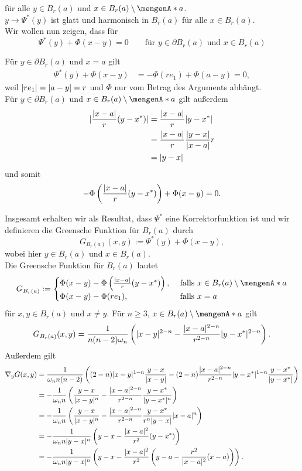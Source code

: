 für alle $y \in B_r(a)$ und $x \in B_r(a) \setminus \set{a}$. \\
$y \to \Psi^*(y)$ ist glatt und harmonisch in $B_r(a)$ für alle $x \in B_r(a)$. \\
Wir wollen nun zeigen, dass für \[
	\Psi^*(y) + \Phi(x-y)=0 \qquad \text{für } y \in \partial B_r(a) \text{ und } x \in B_r(a)
\]
\begin{beweis}
	Für $y \in \partial B_r(a)$ und $x = a$ gilt
	\begin{align*}
		\Psi^*(y)+ \Phi(x-y) &= - \Phi(re_1) + \Phi(a-y) = 0,
	\end{align*}
	weil $\lvert re_1\rvert = \lvert a-y\rvert = r$ und $\Phi$ nur vom Betrag des Arguments abhängt. \\
	Für $y \in \partial B_r(a)$ und $x \in B_r(a) \setminus \set{a}$ gilt außerdem
	\begin{align*}
		\lvert\frac{\lvert x-a\rvert}{r}(y-x^*)\rvert &= \frac{\lvert x-a\rvert}{r} \lvert y-x^*\rvert \\
		&= \frac{\lvert x-a\rvert}{r} \frac{\lvert y-x\rvert}{\lvert x-a\rvert}r  \\ 
		&= \lvert y-x\rvert
	\end{align*}
	und somit
	\[
		- \Phi \left( \frac{\lvert x-a\rvert}{r}(y-x^*) \right) + \Phi(x-y)= 0.
	\]
	\end{beweis}
	Insgesamt erhalten wir als Resultat, dass $\Psi^*$ eine Korrektorfunktion ist und wir definieren die Greensche Funktion für $B_r(a)$ durch
	\[
		G_{B_r(a)}(x,y) := \Psi^*(y) + \Phi(x-y),
	\]
	wobei hier $y \in B_r(a)$ und $x \in B_r(a)$. \\
	Die Greensche Funktion für $B_r(a)$ lautet
	\[
		G_{B_r(a)} := \begin{cases}
			 \Phi(x-y)- \Phi \left( \frac{\abs{x-a}}{r}(y-x^*) \right) , &\text{ falls }x \in B_r(a) \setminus \set{a}\\
			 \Phi(x-y)- \Phi(re_1) , &\text{ falls }x =a
		\end{cases}
	\]
	für $x,y \in B_r(a)$ und $x \neq y$. Für $n \geq 3$, $x \in  B_r(a) \setminus \set{a}$ gilt
	\[
		G_{B_r(a)}(x,y) = \frac{1}{n (n-2) \omega_n} \left( \lvert x-y\rvert^{2-n} - \frac{ \lvert x-a\rvert^{2-n}}{r^{2-n}} \lvert y - x^*\rvert^{2-n} \right).
	\]
	Außerdem gilt
	\begin{align*}
		 \nabla_y G(x,y) &= \frac{1}{\omega_n n(n-2)} \left( (2-n) \lvert x-y\rvert^{1-n} \frac{y-x}{\lvert x-y\rvert} 
		 - (2-n) \frac{\lvert x-a\rvert^{2-n}}{r ^{2-n}} \lvert y-x^*\rvert^{1-n} \frac{y-x^*}{\lvert y-x^*\rvert} \right) \\
		 &= - \frac{1}{\omega_nn} \left( \frac{y-x}{\lvert x-y\rvert^n} - \frac{\lvert x-a\rvert^{2-n}}{r^{2-n}} \frac{y- x^*}{\lvert y- x^*\rvert^n} \right) \\
		 &= - \frac{1}{\omega_nn} \left( \frac{y-x}{\lvert x-y\rvert^n} - \frac{\lvert x-a\rvert^{2-n}}{r^{2-n}} \frac{y-x^*}{r^n \lvert y-x\rvert} \lvert x-a\rvert^n \right) \\
		 &= - \frac{1}{\omega_n n \lvert y-x\rvert^n} \left( y-x - \frac{\lvert x-a\rvert^2}{r^2}(y-x^*) \right) \\
		 &= - \frac{1}{\omega_n n \lvert y-x\rvert^n} \left( y-x - \frac{\lvert x-a\rvert^2}{r^2} \left( y - a - \frac{r^2}{\lvert x-a\rvert^2}(x-a) \right) \right).
	\end{align*}
